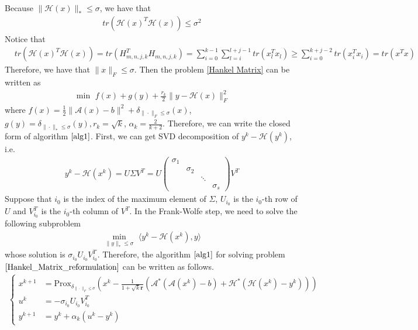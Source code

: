 \documentclass{article}
\numberwithin{equation}{section}
\begin{document}
Because $\|\mathcal{H}(x)\rVert_* \leq \sigma$, we have that
\begin{align}
    tr\left(\mathcal{H}(x)^T\mathcal{H}(x)\right) \leq \sigma^2 \nonumber
\end{align}
Notice that 
\begin{align}
    &tr\left(\mathcal{H}(x)^T\mathcal{H}(x)\right)  = 
    tr\left(H_{m,n,j,k}^T H_{m,n,j,k}\right) =\sum\limits_{i =0}^{k-1}\sum\limits_{l=i}^{l+j-1} 
    tr\left(x_l^Tx_l\right) \geq \sum\limits_{i=0}^{k+j-2} tr\left(x_i^Tx_i\right)
    = tr\left(x^Tx\right) \nonumber
\end{align}
Therefore, we have that $\|x\rVert_F \leq \sigma$.
Then the problem \eqref{Hankel Matrix} can be written as 
\begin{align}\label{Hankel_Matrix_reformulation}
    \min\hspace{4pt} f(x) + g(y) +\frac{r_k}{2}\|y-\mathcal{H}(x) \rVert_F^2 
\end{align}
where $f(x) = \frac{1}{2}\|\mathcal{A}(x)-b\rVert^2 + \delta_{\|\cdot\rVert_F \leq \sigma}(x)$, 
$g(y) = \delta_{\|\cdot\rVert_* \leq \sigma}(y), r_k = \sqrt{k}$, $\alpha_k =\frac{2}{k+2}$.
Therefore, we can write the closed form of algorithm $\ref{alg1}$.
First, we can get SVD decomposition of $y^k - \mathcal{H}(y^k)$, i.e.
\begin{align}
    y^k -\mathcal{H}(x^k) = U\Sigma V^T  = U \left(\begin{array}{cccc}
        \sigma_1 &  & & \\
          &\sigma_2 & & \\
          &   & \ddots & \\
          &   &     &\sigma_s
    \end{array}\right)  V^T \nonumber
\end{align}
Suppose that $i_0$ is the index of the maximum element of $\Sigma$, $U_{i_0}$ is the $i_0$-th row of $U$ and 
$V^T_{i_0}$ is the $i_0$-th column of $V^T$. 
In the Frank-Wolfe step, 
we need  to solve the following subproblem
\begin{align}
    \min\limits_{\|y\rVert_* \leq \sigma} \hspace{4pt} \langle y^k - \mathcal{H}(x^k), y\rangle \nonumber
\end{align}
whose solution is $\sigma_{i_0}U_{i_0}V_{i_0}^T$. Therefore, the algorithm $\ref{alg1}$ for solving 
problem $\eqref{Hankel_Matrix_reformulation}$ can be written as follows. 
\begin{align}
    \left\{
        \begin{aligned}
            x^{k+1} &= \mathrm{Prox}_{\delta_{\|\cdot\rVert_F \leq \sigma}}\left(x^k-\frac{1}{1+\sqrt{k}\mathbf{r}}\left(\mathcal{A^*}\left(\mathcal{A}(x^k)-b\right)
            +\mathcal{H^*}\left(\mathcal{H}(x^k) -y^k\right)\right)\right) \\
            u^k &= -\sigma_{i_0}U_{i_0}V_{i_0}^T \\
            y^{k+1} &= y^k+ \alpha_k(u^k-y^k)
        \end{aligned}
     \right.
\end{align}
\end{document}
